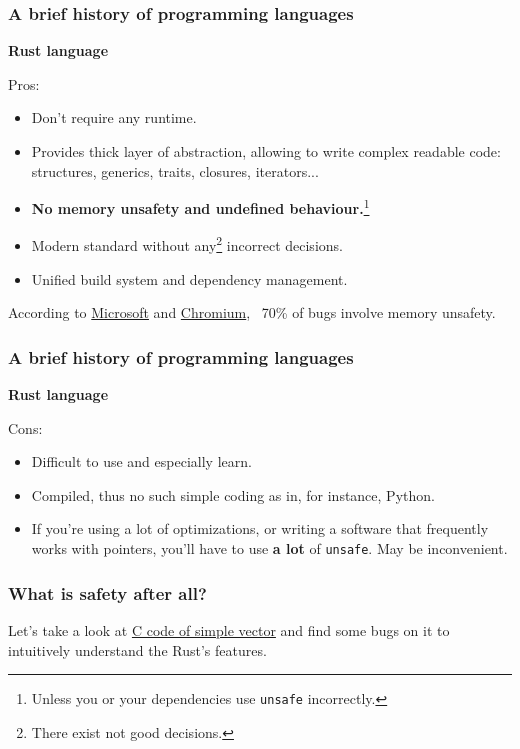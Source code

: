 \documentclass[aspectratio=1610,t]{beamer}
\begin{document}
\begin{frame}
\frametitle{A brief history of programming languages}
\textbf{Rust language}

Pros:
\begin{itemize}
    \item Don't require any runtime.
    \item Provides thick layer of abstraction, allowing to write complex readable code: structures, generics, traits, closures, iterators...
    \item \textbf{No memory unsafety and undefined behaviour.}\footnote{Unless you or your dependencies use \texttt{unsafe} incorrectly.}
    \item Modern standard without any\footnote{There exist not good decisions.} incorrect decisions.
    \item Unified build system and dependency management.
\end{itemize}

According to \href{https://www.zdnet.com/article/microsoft-70-percent-of-all-security-bugs-are-memory-safety-issues/}{Microsoft} and \href{https://www.chromium.org/Home/chromium-security/memory-safety}{Chromium}, ~70\% of bugs involve memory unsafety.
\end{frame}


\begin{frame}
\frametitle{A brief history of programming languages}
\textbf{Rust language}

Cons:
\begin{itemize}
    \item Difficult to use and especially learn.
    \item Compiled, thus no such simple coding as in, for instance, Python.
    \item If you're using a lot of optimizations, or writing a software that frequently works with pointers, you'll have to use \textbf{a lot} of \texttt{unsafe}. May be inconvenient.
\end{itemize}
\end{frame}


\begin{frame}
\frametitle{What is safety after all?}

Let's take a look at \href{run:code/find-bugs.c}{C code of simple vector} and find some bugs on it to intuitively understand the Rust's features.

\end{frame}
\end{document}

